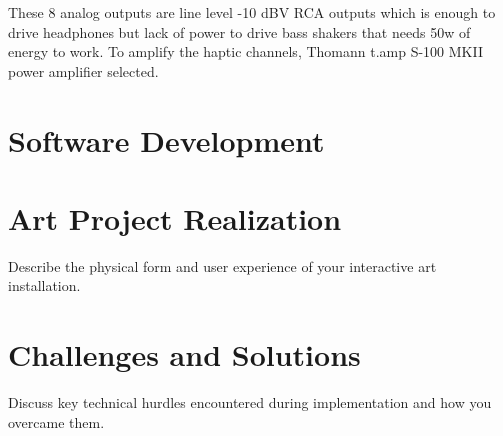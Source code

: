         These 8 analog outputs are line level -10 dBV RCA outputs which is enough to drive headphones but lack of power to drive bass shakers that needs 50w of energy to work. To amplify the haptic channels, Thomann t.amp S-100 MKII power amplifier selected.\par
    \section{Software Development}
    \section{Art Project Realization} Describe the physical form and user experience of your interactive art installation.
    \section{Challenges and Solutions} Discuss key technical hurdles encountered during implementation and how you overcame them.